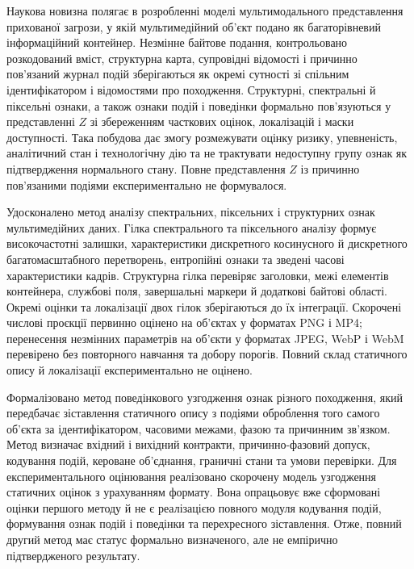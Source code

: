 Наукова новизна полягає в розробленні моделі мультимодального представлення прихованої загрози, у якій мультимедійний об’єкт подано як багаторівневий інформаційний контейнер. Незмінне байтове подання, контрольовано розкодований вміст, структурна карта, супровідні відомості і причинно пов’язаний журнал подій зберігаються як окремі сутності зі спільним ідентифікатором і відомостями про походження. Структурні, спектральні й піксельні ознаки, а також ознаки подій і поведінки формально пов’язуються у представленні $Z$ зі збереженням часткових оцінок, локалізацій і маски доступності. Така побудова дає змогу розмежувати оцінку ризику, упевненість, аналітичний стан і технологічну дію та не трактувати недоступну групу ознак як підтвердження нормального стану. Повне представлення $Z$ із причинно пов’язаними подіями експериментально не формувалося.

Удосконалено метод аналізу спектральних, піксельних і структурних ознак мультимедійних даних. Гілка спектрального та піксельного аналізу формує високочастотні залишки, характеристики дискретного косинусного й дискретного багатомасштабного перетворень, ентропійні ознаки та зведені часові характеристики кадрів. Структурна гілка перевіряє заголовки, межі елементів контейнера, службові поля, завершальні маркери й додаткові байтові області. Окремі оцінки та локалізації двох гілок зберігаються до їх інтеграції. Скорочені числові проєкції первинно оцінено на об’єктах у форматах PNG і MP4; перенесення незмінних параметрів на об’єкти у форматах JPEG, WebP і WebM перевірено без повторного навчання та добору порогів. Повний склад статичного опису й локалізації експериментально не оцінено.

Формалізовано метод поведінкового узгодження ознак різного походження, який передбачає зіставлення статичного опису з подіями оброблення того самого об’єкта за ідентифікатором, часовими межами, фазою та причинним зв’язком. Метод визначає вхідний і вихідний контракти, причинно-фазовий допуск, кодування подій, кероване об’єднання, граничні стани та умови перевірки. Для експериментального оцінювання реалізовано скорочену модель узгодження статичних оцінок з урахуванням формату. Вона опрацьовує вже сформовані оцінки першого методу й не є реалізацією повного модуля кодування подій, формування ознак подій і поведінки та перехресного зіставлення. Отже, повний другий метод має статус формально визначеного, але не емпірично підтвердженого результату.

